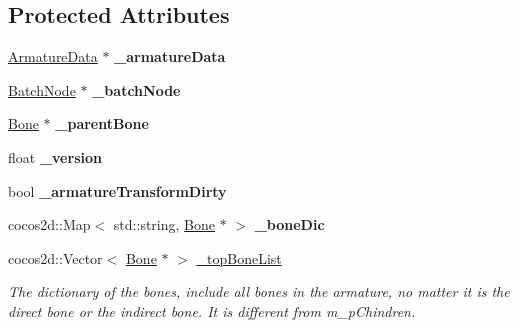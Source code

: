 \subsection*{Protected Attributes}
\begin{DoxyCompactItemize}
\item 
\mbox{\label{classcocostudio_1_1Armature_a4bba5b545df8690bdc5dff4d67b00f8a}} 
\hyperlink{classcocostudio_1_1ArmatureData}{Armature\+Data} $\ast$ {\bfseries \+\_\+armature\+Data}
\item 
\mbox{\label{classcocostudio_1_1Armature_a7a1e9f3846c1f07281b29605f7732d5e}} 
\hyperlink{classcocostudio_1_1BatchNode}{Batch\+Node} $\ast$ {\bfseries \+\_\+batch\+Node}
\item 
\mbox{\label{classcocostudio_1_1Armature_a47386e7a21e9802de80c97512aa7a5b8}} 
\hyperlink{classcocostudio_1_1Bone}{Bone} $\ast$ {\bfseries \+\_\+parent\+Bone}
\item 
\mbox{\label{classcocostudio_1_1Armature_a649e9737b65a38e9e6ec0b6e8300f872}} 
float {\bfseries \+\_\+version}
\item 
\mbox{\label{classcocostudio_1_1Armature_a909ca816325ae9231a797cd6da0af65c}} 
bool {\bfseries \+\_\+armature\+Transform\+Dirty}
\item 
\mbox{\label{classcocostudio_1_1Armature_ace042b0625c6fa7f73eb00a557d2b714}} 
cocos2d\+::\+Map$<$ std\+::string, \hyperlink{classcocostudio_1_1Bone}{Bone} $\ast$ $>$ {\bfseries \+\_\+bone\+Dic}
\item 
\mbox{\label{classcocostudio_1_1Armature_a6701a1a54ccb815bcb7ecfd8217f7781}} 
cocos2d\+::\+Vector$<$ \hyperlink{classcocostudio_1_1Bone}{Bone} $\ast$ $>$ \hyperlink{classcocostudio_1_1Armature_a6701a1a54ccb815bcb7ecfd8217f7781}{\+\_\+top\+Bone\+List}
\begin{DoxyCompactList}\small\item\em The dictionary of the bones, include all bones in the armature, no matter it is the direct bone or the indirect bone. It is different from m\+\_\+p\+Chindren. \end{DoxyCompactList}\item 

\end{DoxyCompactItemize}
